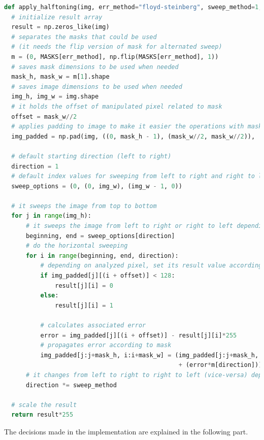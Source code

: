\documentclass[]{IEEEtran}
\begin{document}
\begin{lstlisting}[language=Python, caption={Implementation of halftoning solution}, label={code:halftoning}]
def apply_halftoning(img, err_method="floyd-steinberg", sweep_method=1, benchmarking=False):
  # initialize result array
  result = np.zeros_like(img)
  # separates the masks that could be used
  # (it needs the flip version of mask for alternated sweep)
  m = (0, MASKS[err_method], np.flip(MASKS[err_method], 1))
  # saves mask dimensions to be used when needed
  mask_h, mask_w = m[1].shape
  # saves image dimensions to be used when needed
  img_h, img_w = img.shape
  # it holds the offset of manipulated pixel related to mask
  offset = mask_w//2
  # applies padding to image to make it easier the operations with mask
  img_padded = np.pad(img, ((0, mask_h - 1), (mask_w//2, mask_w//2)), 'constant')

  # default starting direction (left to right)
  direction = 1
  # default index values for sweeping from left to right and right to left
  sweep_options = (0, (0, img_w), (img_w - 1, 0))

  # it sweeps the image from top to bottom
  for j in range(img_h):
      # it sweeps the image from left to right or right to left depending on direction
      beginning, end = sweep_options[direction]
      # do the horizontal sweeping
      for i in range(beginning, end, direction):
          # depending on analyzed pixel, set its result value according to threshold
          if img_padded[j][(i + offset)] < 128:
              result[j][i] = 0
          else:
              result[j][i] = 1

          # calculates associated error
          error = img_padded[j][(i + offset)] - result[j][i]*255
          # propagates error according to mask
          img_padded[j:j+mask_h, i:i+mask_w] = (img_padded[j:j+mask_h, i:i+mask_w]
                                                + (error*m[direction])).astype(np.uint8)
      # it changes from left to right to right to left (vice-versa) depending on the sweep method
      direction *= sweep_method

  # scale the result
  return result*255

\end{lstlisting}
The decisions made in the implementation are explained in the following part.
\end{document}
